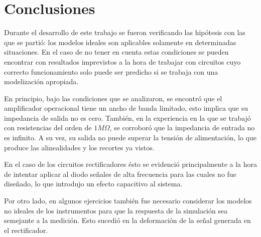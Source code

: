 \section{Conclusiones}
\label{sec:conclu}

Durante el desarrollo de este trabajo se fueron verificando las hipótesis con las que se partió: los modelos ideales son aplicables solamente en determinadas situaciones. En el caso de no tener en cuenta estas condiciones se pueden encontrar con resultados imprevistos a la hora de trabajar con circuitos cuyo correcto funcionamiento solo puede ser predicho si se trabaja con una modelización apropiada.

En principio, bajo las condiciones que se analizaron, se encontró que el amplificador operacional tiene un ancho de banda limitado, esto implica que su impedancia de salida no es cero. También, en la experiencia en la que se trabajó con resistencias del orden de $1M\Omega$, se corroboró que la impedancia de entrada no es infinito. A su vez, su salida no puede superar la tensión de alimentación, lo que produce las alinealidades y los recortes ya vistos.

En el caso de los circuitos rectificadores ésto se evidenció principalmente a la hora de intentar aplicar al diodo señales de alta frecuencia para las cuales no fue diseñado, lo que introdujo un efecto capacitivo al sistema.

Por otro lado, en algunos ejercicios también fue necesario considerar los modelos no ideales de los instrumentos para que la respuesta de la simulación sea semejante a la medición. Esto sucedió en la deformación de la señal generada en el rectificador.


